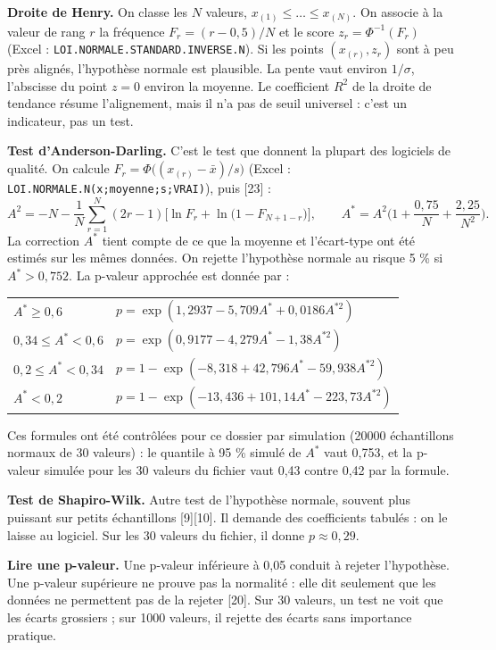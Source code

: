 \documentclass[11pt,a4paper]{article}
\newcommand{\xl}[1]{\texttt{\small #1}}
\begin{document}
\textbf{Droite de Henry.} On classe les $N$ valeurs, $x_{(1)}\le\dots\le x_{(N)}$. On associe à la valeur de rang $r$ la fréquence $F_r=(r-0{,}5)/N$ et le score $z_r=\Phi^{-1}(F_r)$ (Excel : \xl{LOI.NORMALE.STANDARD.INVERSE.N}). Si les points $(x_{(r)},z_r)$ sont à peu près alignés, l'hypothèse normale est plausible. La pente vaut environ $1/\sigma$, l'abscisse du point $z=0$ environ la moyenne. Le coefficient $R^2$ de la droite de tendance résume l'alignement, mais il n'a pas de seuil universel : c'est un indicateur, pas un test.

\textbf{Test d'Anderson-Darling.} C'est le test que donnent la plupart des logiciels de qualité. On calcule $F_r=\Phi\big((x_{(r)}-\bar x)/s\big)$ (Excel : \xl{LOI.NORMALE.N(x;moyenne;s;VRAI)}), puis [23] :
\[
A^2=-N-\frac1N\sum_{r=1}^{N}(2r-1)\Big[\ln F_r+\ln\big(1-F_{N+1-r}\big)\Big],\qquad A^{*}=A^2\Big(1+\frac{0{,}75}{N}+\frac{2{,}25}{N^2}\Big).
\]
La correction $A^*$ tient compte de ce que la moyenne et l'écart-type ont été estimés sur les mêmes données. On rejette l'hypothèse normale au risque 5 \% si $A^*>0{,}752$. La p-valeur approchée est donnée par :
\begin{center}\small
\begin{tabular}{@{}ll@{}}\toprule
$A^*\ge0{,}6$ & $p=\exp(1{,}2937-5{,}709A^*+0{,}0186A^{*2})$\\
$0{,}34\le A^*<0{,}6$ & $p=\exp(0{,}9177-4{,}279A^*-1{,}38A^{*2})$\\
$0{,}2\le A^*<0{,}34$ & $p=1-\exp(-8{,}318+42{,}796A^*-59{,}938A^{*2})$\\
$A^*<0{,}2$ & $p=1-\exp(-13{,}436+101{,}14A^*-223{,}73A^{*2})$\\\bottomrule
\end{tabular}
\end{center}
Ces formules ont été contrôlées pour ce dossier par simulation (\num{20000} échantillons normaux de 30 valeurs) : le quantile à 95 \% simulé de $A^*$ vaut 0,753, et la p-valeur simulée pour les 30 valeurs du fichier vaut 0,43 contre 0,42 par la formule.

\textbf{Test de Shapiro-Wilk.} Autre test de l'hypothèse normale, souvent plus puissant sur petits échantillons [9][10]. Il demande des coefficients tabulés : on le laisse au logiciel. Sur les 30 valeurs du fichier, il donne $p\approx0{,}29$.

\textbf{Lire une p-valeur.} Une p-valeur inférieure à 0,05 conduit à rejeter l'hypothèse. Une p-valeur supérieure ne prouve pas la normalité : elle dit seulement que les données ne permettent pas de la rejeter [20]. Sur 30 valeurs, un test ne voit que les écarts grossiers ; sur \num{1000} valeurs, il rejette des écarts sans importance pratique.
\end{document}
